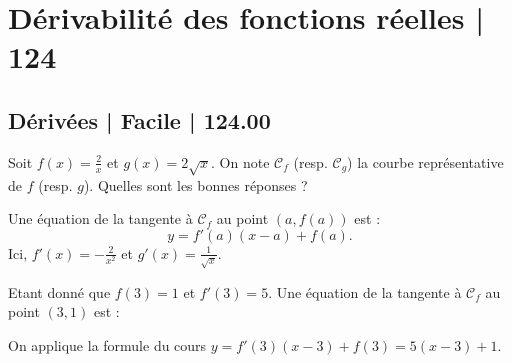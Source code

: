 




\section{Dérivabilité des fonctions réelles | 124}

\subsection{Dérivées | Facile | 124.00}


\begin{question}
Soit $\displaystyle f(x)=\frac{2}{x}$ et $g(x)=2\sqrt{x}$. On note $\mathscr{C}_f$ (resp. $\mathscr{C}_g$) la courbe représentative de $f$ (resp. $g$). Quelles sont les bonnes réponses ?
\begin{answers}  
\end{answers}
\begin{explanations}
Une équation de la tangente à $\mathscr{C}_f$ au point $(a,f(a))$ est : 
$$y=f'(a)(x-a)+f(a).$$
Ici, $\displaystyle f'(x)=-\frac{2}{x^2}$ et $\displaystyle g'(x)=\frac{1}{\sqrt{x}}$.
\end{explanations}
\end{question}





\begin{question}
Etant donné que $\displaystyle f(3)=1$ et $f'(3)=5$. Une équation de la tangente à $\mathscr{C}_f$ au point $(3,1)$ est :
\begin{answers}  
\end{answers}
\begin{explanations}
On applique la formule du cours $\displaystyle y=f'(3)(x-3)+f(3)=5(x-3)+1$.
\end{explanations}
\end{question}



